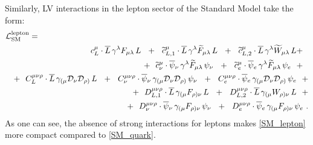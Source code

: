 \documentclass[12pt,preprintnumbers,nofootinbib]{revtex4}
\newcommand{\wt}{\widetilde}
\newcommand{\ov}{\overline}
\newcommand{\md}{\mathcal{D}}
\begin{document}


	Similarly, LV interactions in the lepton sector of the Standard Model
	take the form:
\begin{eqnarray}
\nonumber
\lefteqn{
	\mathcal{L}_{\rm SM}^{\rm lepton} =
	}
	\\
\nonumber
	&&
	\phantom{+~~}
	c_L^\mu \cdot
	\ov{L}\, \gamma^{\lambda} F_{\mu\lambda}\, L
	~~+~~
	\wt{c}_{L,1}^\mu \cdot
	\ov{L}\, \gamma^{\lambda} \wt{F}_{\mu\lambda}\, L
	~~+~~
	\wt{c}_{L,2}^\mu \cdot
	\ov{L}\, \gamma^{\lambda} \wt{W}_{\mu\lambda}\, L
	+~~
	\\
\nonumber
	&&
	+~~
	\wt{c}_{\nu}^\mu \cdot
	\ov{\psi}{}_\nu\, \gamma^{\lambda} \wt{F}_{\mu\lambda}\, \psi_\nu
	~~+~~
	\wt{c}_{e}^\mu \cdot
	\ov{\psi}{}_e\, \gamma^{\lambda} \wt{F}_{\mu\lambda}\, \psi_e
	~~+~~
	\\
\nonumber
	&&
	+~~
	C_L^{\mu\nu\rho} \cdot
	\ov{L}\, \gamma_{(\mu} \md_\nu \md_{\rho)}\, L
	~~+~~
	C_{\nu}^{\mu\nu\rho} \cdot
	\ov{\psi}{}_\nu\, \gamma_{(\mu} \md_\nu \md_{\rho)}\, \psi_\nu
	~~+~~
	C_{e}^{\mu\nu\rho} \cdot
	\ov{\psi}{}_e\, \gamma_{(\mu} \md_\nu \md_{\rho)}\, \psi_e
	~~+
	\\
\label{SM_lepton}
	&&
	+~~
	D_{L,1}^{\mu\nu\rho} \cdot
	\ov{L}\, \gamma_{(\mu} F_{\rho)\nu}\, L
	~~+~~
	D_{L,2}^{\mu\nu\rho} \cdot
	\ov{L}\, \gamma_{(\mu} W_{\rho)\nu}\, L
	~~+
	\\
\nonumber
	&&
	+~~
	D_{\nu}^{\mu\nu\rho} \cdot
	\ov{\psi}{}_\nu\, \gamma_{(\mu} F_{\rho)\nu}\, \psi_\nu
	~~+~~
	D_{e}^{\mu\nu\rho} \cdot
	\ov{\psi}{}_e\, \gamma_{(\mu} F_{\rho)\nu}\, \psi_e
	~.
\end{eqnarray}
	As one can see, the absence of strong interactions for leptons
    makes  \eqref{SM_lepton} more compact compared to  
	\eqref{SM_quark}.
\end{document}
